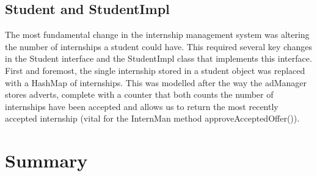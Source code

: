 \documentclass[11pt]{l3deliverable}
\begin{document}
\subsection{Student and StudentImpl}

The most fundamental change in the internship management system was altering the
number of internships a student could have. This required several key changes
in the Student interface and the StudentImpl class that implements this interface.
First and foremost, the single internship stored in a student object was replaced 
with a HashMap of internships. This was modelled after the way the adManager stores
adverts, complete with a counter that both counts the number of internships have been 
accepted and allows us to return the most recently accepted internship (vital for the 
InternMan method approveAcceptedOffer()).

\section{Summary}
\end{document}
